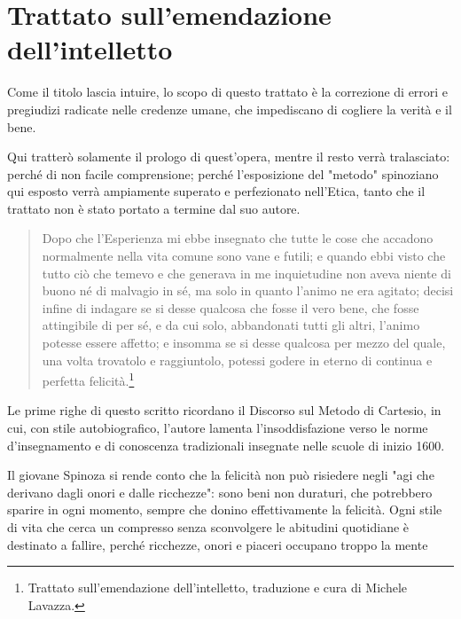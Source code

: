 \chapter{Trattato sull'emendazione dell'intelletto}

\bigskip
\bigskip
\bigskip

Come il titolo lascia intuire, lo scopo di questo trattato è la correzione di errori e pregiudizi radicate nelle credenze umane, che impediscano di cogliere la verità e il bene.

Qui tratterò solamente il prologo di quest'opera, mentre il resto verrà tralasciato: perché di non facile comprensione; perché l'esposizione del "metodo" spinoziano qui esposto verrà ampiamente superato  e perfezionato nell'Etica, tanto che il trattato non è stato portato a termine dal suo autore.

\begin{quotation}
	\small Dopo che l'Esperienza mi ebbe insegnato che tutte le cose che accadono normalmente nella vita
	comune sono vane e futili; e quando ebbi visto che tutto ciò che temevo e che generava in me
	inquietudine non aveva niente di buono né di malvagio in sé, ma solo in quanto l'animo ne era
	agitato; decisi infine di indagare se si desse qualcosa che fosse il vero bene, che fosse attingibile di
	per sé, e da cui solo, abbandonati tutti gli altri, l'animo potesse essere affetto; e insomma se si desse
	qualcosa per mezzo del quale, una volta trovatolo e raggiuntolo, potessi godere in eterno di continua
	e perfetta felicità.\footnote{Trattato sull'emendazione dell'intelletto, traduzione e cura di Michele Lavazza.}
\end{quotation}

Le prime righe di questo scritto ricordano il Discorso sul Metodo di Cartesio, in cui, con stile autobiografico, l'autore lamenta l'insoddisfazione verso le norme d'insegnamento e di conoscenza tradizionali insegnate nelle scuole di inizio 1600.

Il giovane Spinoza si rende conto che la felicità non può risiedere negli "agi che derivano dagli
onori e dalle ricchezze": sono beni non duraturi, che potrebbero sparire in ogni momento, sempre che donino effettivamente la felicità. Ogni stile di vita che cerca un compresso senza sconvolgere le abitudini quotidiane è destinato a fallire, perché ricchezze, onori e piaceri occupano troppo la mente

